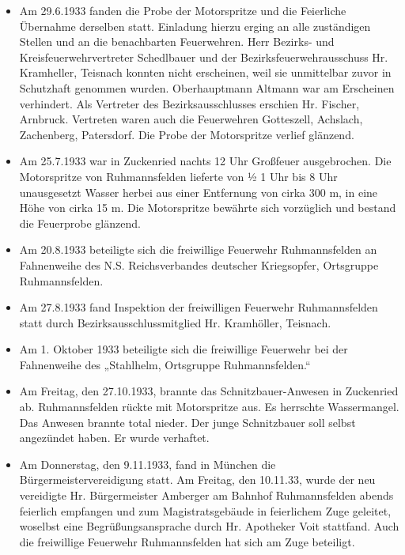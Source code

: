 \documentclass[12pt,a4paper]{book}
\begin{document}
\begin{itemize}
\item Am 29.6.1933 fanden die Probe der Motorspritze und die Feierliche
Übernahme derselben statt. Einladung hierzu erging an alle zuständigen
Stellen und an die benachbarten Feuerwehren. Herr Bezirks- und
Kreisfeuerwehrvertreter Schedlbauer und der Bezirksfeuerwehrausschuss
Hr. Kramheller, Teisnach konnten nicht erscheinen, weil sie unmittelbar
zuvor in Schutzhaft genommen wurden. Oberhauptmann Altmann war am
Erscheinen verhindert. Als Vertreter des Bezirksausschlusses erschien
Hr. Fischer, Arnbruck. Vertreten waren auch die Feuerwehren Gotteszell,
Achslach, Zachenberg, Patersdorf. Die Probe der Motorspritze verlief
glänzend.

\item Am 25.7.1933 war in Zuckenried nachts 12 Uhr Großfeuer
ausgebrochen. Die Motorspritze von Ruhmannsfelden lieferte von ½ 1 Uhr
bis 8 Uhr unausgesetzt Wasser herbei aus einer Entfernung von cirka 300
m, in eine Höhe von cirka 15 m. Die Motorspritze bewährte sich
vorzüglich und bestand die Feuerprobe glänzend.

\item Am 20.8.1933 beteiligte sich die freiwillige Feuerwehr
Ruhmannsfelden an Fahnenweihe des N.S. Reichsverbandes deutscher
Kriegsopfer, Ortsgruppe Ruhmannsfelden.

\item Am 27.8.1933 fand Inspektion der freiwilligen Feuerwehr
Ruhmannsfelden statt durch Bezirksausschlussmitglied Hr. Kramhöller,
Teisnach.

\item Am 1. Oktober 1933 beteiligte sich die freiwillige Feuerwehr bei
der Fahnenweihe des „Stahlhelm, Ortsgruppe Ruhmannsfelden.“

\item Am Freitag, den 27.10.1933, brannte das Schnitzbauer-Anwesen in
Zuckenried ab. Ruhmannsfelden rückte mit Motorspritze aus. Es herrschte
Wassermangel. Das Anwesen brannte total nieder. Der junge Schnitzbauer
soll selbst angezündet haben. Er wurde verhaftet.

\item Am Donnerstag, den 9.11.1933, fand in München die
Bürgermeistervereidigung statt. Am Freitag, den 10.11.33, wurde der neu
vereidigte Hr. Bürgermeister Amberger am Bahnhof Ruhmannsfelden abends
feierlich empfangen und zum Magistratsgebäude in feierlichem Zuge
geleitet, woselbst eine Begrüßungsansprache durch Hr. Apotheker Voit
stattfand. Auch die freiwillige Feuerwehr Ruhmannsfelden hat sich am
Zuge beteiligt.
\end{itemize}
\end{document}

